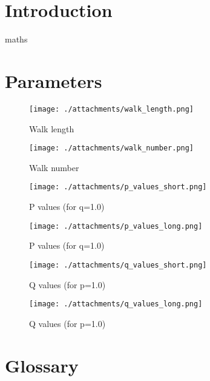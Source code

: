 \documentclass[a4paper,10pt]{article}
\begin{document}



\tableofcontents
\newpage

\section{Introduction}
\gls{maths}
\clearpage

\section{Parameters}

\begin{figure}[!tbp]
  \centering
  \begin{minipage}[b]{0.49\textwidth}
    \texttt{[image: ./attachments/walk\_length.png]}
      \caption{Walk length}
      \label{fig:walk-length}
  \end{minipage}
  \hfill
  \begin{minipage}[b]{0.49\textwidth}
    \texttt{[image: ./attachments/walk\_number.png]}
      \caption{Walk number}
      \label{fig:walk-number}
  \end{minipage}
\end{figure}

\begin{figure}[!tbp]
  \centering
  \begin{minipage}[b]{0.49\textwidth}
    \texttt{[image: ./attachments/p\_values\_short.png]}
    \caption{P values (for q=1.0)}
    \label{fig:q-values}
  \end{minipage}
  \hfill
  \begin{minipage}[b]{0.49\textwidth}
    \texttt{[image: ./attachments/p\_values\_long.png]}
    \caption{P values (for q=1.0)}
    \label{fig:p-values}
  \end{minipage}
\end{figure}

\begin{figure}[!tbp]
  \centering
  \begin{minipage}[b]{0.49\textwidth}
    \texttt{[image: ./attachments/q\_values\_short.png]}
    \caption{Q values (for p=1.0)}
    \label{fig:q-values}
  \end{minipage}
  \hfill
  \begin{minipage}[b]{0.49\textwidth}
    \texttt{[image: ./attachments/q\_values\_long.png]}
    \caption{Q values (for p=1.0)}
    \label{fig:p-values}
  \end{minipage}
\end{figure}


\section{Glossary}

\printglossaries
\end{document}
